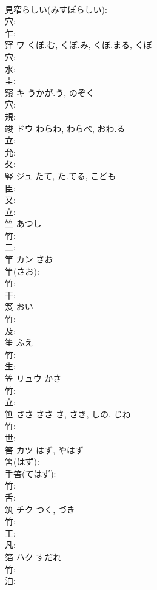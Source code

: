 \documentclass[8pt]{extreport}
\begin{document}
\begin{CJK}{UTF8}{min}
\\	見窄らしい(みすぼらしい): 
\\	穴: 
\\	乍: 
\\	窪	ワ	くぼ.む, くぼ.み, くぼ.まる, くぼ		
\\	穴: 
\\	水: 
\\	圭: 
\\	窺	キ	うかが.う, のぞく		
\\	穴: 
\\	規: 
\\	竣	ドウ	わらわ, わらべ, おわ.る		
\\	立: 
\\	允: 
\\	夂: 
\\	竪	ジュ	たて, た.てる, こども		
\\	臣: 
\\	又: 
\\	立: 
\\	竺			あつし		
\\	竹: 
\\	二: 
\\	竿	カン	さお		
\\	竿(さお): 
\\	竹: 
\\	干: 
\\	笈			おい		
\\	竹: 
\\	及: 
\\	笙		ふえ			
\\	竹: 
\\	生: 
\\	笠	リュウ	かさ		
\\	竹: 
\\	立: 
\\	笹	ささ	ささ	さ, さき, しの, じね	
\\	竹: 
\\	世: 
\\	筈	カツ	はず, やはず		
\\	筈(はず): 
\\	手筈(てはず): 
\\	竹: 
\\	舌: 
\\	筑	チク		つく, づき	
\\	竹: 
\\	工: 
\\	凡: 
\\	箔	ハク	すだれ		
\\	竹: 
\\	泊: 

\end{CJK}
\end{document}
